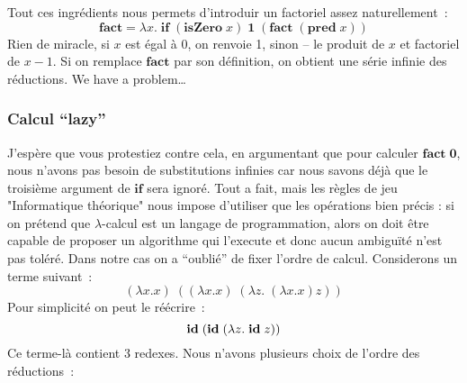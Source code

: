 \subsubsection*{}
Tout ces ingrédients nous permets d'introduir un factoriel assez naturellement~:
$$\mathbf{fact} = \lambda x. \; \mathbf{if} \; (\mathbf{isZero} \; x) \; \mathbf{1} \; (\mathbf{fact} \; (\mathbf{pred} \; x))$$
Rien de miracle, si $x$ est égal à 0, on renvoie 1, sinon -- le produit de $x$ et factoriel de $x-1$.
Si on remplace $\mathbf{fact}$ par son définition, on obtient une série infinie des réductions. We have a problem\ldots

\subsubsection*{Calcul ``lazy''}
J'espère que vous protestiez contre cela, en argumentant que pour calculer $\mathbf{fact\;0}$, nous n'avons pas besoin de substitutions infinies car nous savons déjà que le troisième argument de $\mathbf{if}$ sera ignoré.
Tout a fait, mais les règles de jeu "Informatique théorique" nous impose d'utiliser que les opérations bien précis : si on prétend que $\lambda$-calcul est un langage de programmation, alors on doit être capable de proposer un algorithme qui l'execute et donc aucun ambiguïté n'est pas toléré.
Dans notre cas on a ``oublié'' de fixer l'ordre de calcul.
Considerons un terme suivant~:
$$(\lambda x.x) \; ((\lambda x.x) \; (\lambda z. \; (\lambda x.x) z))$$
Pour simplicité on peut le réécrire~:
$$\mathbf{id} \; (\mathbf{id} \; (\lambda z. \; \mathbf{id} \; z))$$
Ce terme-là contient 3 redexes. Nous n'avons plusieurs choix de l'ordre des réductions~:
